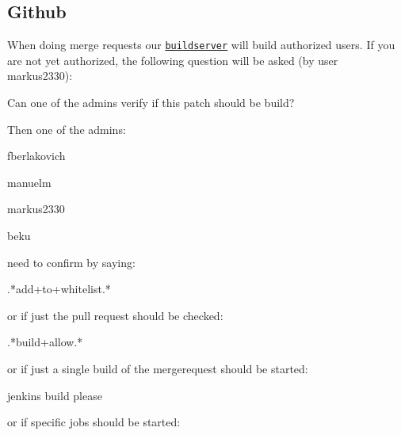 \subsection*{Github}

When doing merge requests our \href{http://build.libelektra.org:8080}{\tt buildserver} will build authorized users. If you are not yet authorized, the following question will be asked (by user markus2330)\+: \begin{DoxyVerb}    Can one of the admins verify if this patch should be build?
\end{DoxyVerb}


Then one of the admins\+:


\begin{DoxyItemize}
\item fberlakovich
\item manuelm
\item markus2330
\item beku
\end{DoxyItemize}

need to confirm by saying\+: \begin{DoxyVerb}    .*add\W+to\W+whitelist.*
\end{DoxyVerb}


or if just the pull request should be checked\+: \begin{DoxyVerb}    .*build\W+allow.*
\end{DoxyVerb}


or if just a single build of the mergerequest should be started\+: \begin{DoxyVerb}    jenkins build please
\end{DoxyVerb}


or if specific jobs should be started\+:


